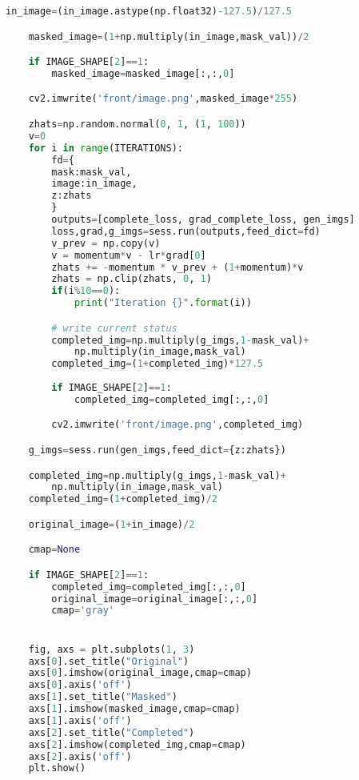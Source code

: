 \begin{lstlisting}[basicstyle=\scriptsize,language=Python]
    in_image=(in_image.astype(np.float32)-127.5)/127.5

    masked_image=(1+np.multiply(in_image,mask_val))/2

    if IMAGE_SHAPE[2]==1:
        masked_image=masked_image[:,:,0]

    cv2.imwrite('front/image.png',masked_image*255)

    zhats=np.random.normal(0, 1, (1, 100))
    v=0
    for i in range(ITERATIONS):
        fd={
        mask:mask_val,
        image:in_image,
        z:zhats
        }
        outputs=[complete_loss, grad_complete_loss, gen_imgs]
        loss,grad,g_imgs=sess.run(outputs,feed_dict=fd)
        v_prev = np.copy(v)
        v = momentum*v - lr*grad[0]
        zhats += -momentum * v_prev + (1+momentum)*v
        zhats = np.clip(zhats, 0, 1)
        if(i%10==0):
            print("Iteration {}".format(i))

        # write current status  
        completed_img=np.multiply(g_imgs,1-mask_val)+
            np.multiply(in_image,mask_val)
        completed_img=(1+completed_img)*127.5
        
        if IMAGE_SHAPE[2]==1:
            completed_img=completed_img[:,:,0]

        cv2.imwrite('front/image.png',completed_img)

    g_imgs=sess.run(gen_imgs,feed_dict={z:zhats})

    completed_img=np.multiply(g_imgs,1-mask_val)+
        np.multiply(in_image,mask_val)
    completed_img=(1+completed_img)/2

    original_image=(1+in_image)/2

    cmap=None

    if IMAGE_SHAPE[2]==1:
        completed_img=completed_img[:,:,0]
        original_image=original_image[:,:,0]            
        cmap='gray'


    fig, axs = plt.subplots(1, 3)
    axs[0].set_title("Original")
    axs[0].imshow(original_image,cmap=cmap)
    axs[0].axis('off')
    axs[1].set_title("Masked")
    axs[1].imshow(masked_image,cmap=cmap)
    axs[1].axis('off')
    axs[2].set_title("Completed")
    axs[2].imshow(completed_img,cmap=cmap)
    axs[2].axis('off')
    plt.show()

\end{lstlisting}
\par\bigskip

